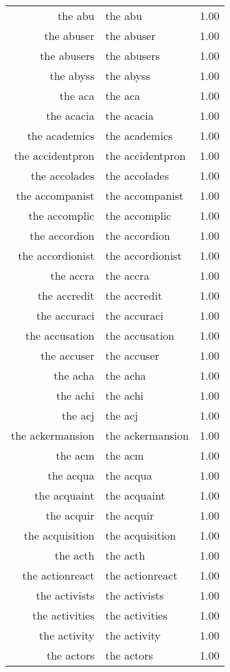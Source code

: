 \begin{table}[ht]
\begin{tabular}{rlr}
  the abu & the abu & 1.00 \\ 
  the abuser & the abuser & 1.00 \\ 
  the abusers & the abusers & 1.00 \\ 
  the abyss & the abyss & 1.00 \\ 
  the aca & the aca & 1.00 \\ 
  the acacia & the acacia & 1.00 \\ 
  the academics & the academics & 1.00 \\ 
  the accidentpron & the accidentpron & 1.00 \\ 
  the accolades & the accolades & 1.00 \\ 
  the accompanist & the accompanist & 1.00 \\ 
  the accomplic & the accomplic & 1.00 \\ 
  the accordion & the accordion & 1.00 \\ 
  the accordionist & the accordionist & 1.00 \\ 
  the accra & the accra & 1.00 \\ 
  the accredit & the accredit & 1.00 \\ 
  the accuraci & the accuraci & 1.00 \\ 
  the accusation & the accusation & 1.00 \\ 
  the accuser & the accuser & 1.00 \\ 
  the acha & the acha & 1.00 \\ 
  the achi & the achi & 1.00 \\ 
  the acj & the acj & 1.00 \\ 
  the ackermansion & the ackermansion & 1.00 \\ 
  the acm & the acm & 1.00 \\ 
  the acqua & the acqua & 1.00 \\ 
  the acquaint & the acquaint & 1.00 \\ 
  the acquir & the acquir & 1.00 \\ 
  the acquisition & the acquisition & 1.00 \\ 
  the acth & the acth & 1.00 \\ 
  the actionreact & the actionreact & 1.00 \\ 
  the activists & the activists & 1.00 \\ 
  the activities & the activities & 1.00 \\ 
  the activity & the activity & 1.00 \\ 
  the actors & the actors & 1.00 \\ 

\end{tabular}
\end{table}
